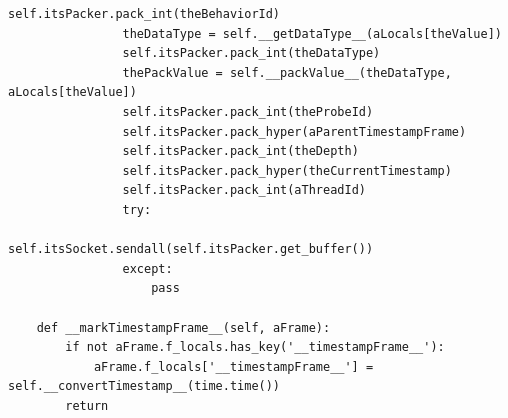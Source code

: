 \documentclass[12pt,legalpaper]{report}
\begin{document}
\begin{singlespace}
\begin{lstlisting}[style=Python]
                self.itsPacker.pack_int(theBehaviorId)
                theDataType = self.__getDataType__(aLocals[theValue])
                self.itsPacker.pack_int(theDataType)
                thePackValue = self.__packValue__(theDataType, aLocals[theValue])
                self.itsPacker.pack_int(theProbeId)
                self.itsPacker.pack_hyper(aParentTimestampFrame)
                self.itsPacker.pack_int(theDepth) 
                self.itsPacker.pack_hyper(theCurrentTimestamp)
                self.itsPacker.pack_int(aThreadId)
                try:
                    self.itsSocket.sendall(self.itsPacker.get_buffer())
                except:
                    pass            
    
    def __markTimestampFrame__(self, aFrame):
        if not aFrame.f_locals.has_key('__timestampFrame__'): 
            aFrame.f_locals['__timestampFrame__'] = self.__convertTimestamp__(time.time())
        return


\end{lstlisting}
\end{singlespace}
\end{document}
